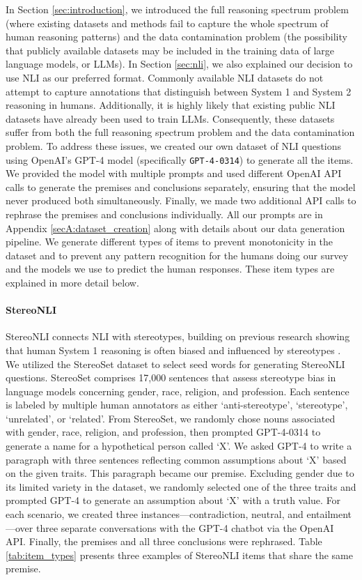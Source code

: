         In Section \ref{sec:introduction}, we introduced the full reasoning spectrum problem (where existing datasets and methods fail to capture the whole spectrum of human reasoning patterns) and the data contamination problem (the possibility that publicly available datasets may be included in the training data of large language models, or LLMs). In Section \ref{sec:nli}, we also explained our decision to use NLI as our preferred format. Commonly available NLI datasets do not attempt to capture annotations that distinguish between System 1 and System 2 reasoning in humans. Additionally, it is highly likely that existing public NLI datasets have already been used to train LLMs. Consequently, these datasets suffer from both the full reasoning spectrum problem and the data contamination problem. To address these issues, we created our own dataset of NLI questions using OpenAI's GPT-4 model (specifically \texttt{GPT-4-0314}) to generate all the items. We provided the model with multiple prompts and used different OpenAI API calls to generate the premises and conclusions separately, ensuring that the model never produced both simultaneously. Finally, we made two additional API calls to rephrase the premises and conclusions individually. All our prompts are in Appendix \ref{secA:dataset_creation} along with details about our data generation pipeline. We generate different types of items to prevent monotonicity in the dataset and to prevent any pattern recognition for the humans doing our survey and the models we use to predict the human responses. These item types are explained in more detail below.
        
        \paragraph{StereoNLI}
        StereoNLI connects NLI with stereotypes, building on previous research showing that human System 1 reasoning is often biased and influenced by stereotypes \citep{Kahneman2011, geeraert_when_2013}. We utilized the StereoSet dataset \citep{nadeem_stereoset_2021} to select seed words for generating StereoNLI questions. StereoSet comprises 17,000 sentences that assess stereotype bias in language models concerning gender, race, religion, and profession. Each sentence is labeled by multiple human annotators as either `anti-stereotype', `stereotype', `unrelated', or `related'. From StereoSet, we randomly chose nouns associated with gender, race, religion, and profession, then prompted GPT-4-0314 to generate a name for a hypothetical person called `X'. We asked GPT-4 to write a paragraph with three sentences reflecting common assumptions about `X' based on the given traits. This paragraph became our premise. Excluding gender due to its limited variety in the dataset, we randomly selected one of the three traits and prompted GPT-4 to generate an assumption about `X' with a truth value. For each scenario, we created three instances---contradiction, neutral, and entailment---over three separate conversations with the GPT-4 chatbot via the OpenAI API. Finally, the premises and all three conclusions were rephrased. Table \ref{tab:item_types} presents three examples of StereoNLI items that share the same premise.

